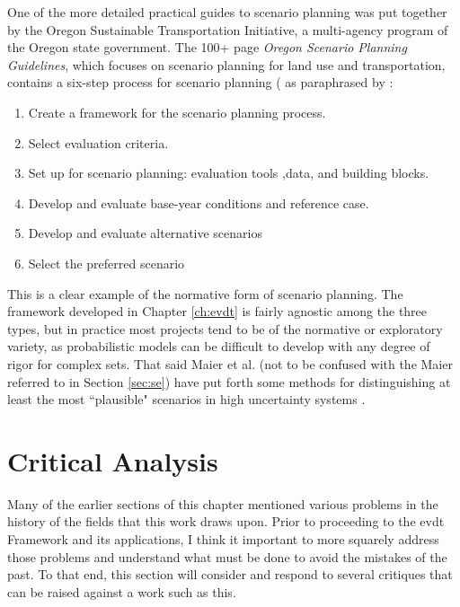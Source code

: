 One of the more detailed practical guides to scenario planning was put together by the Oregon Sustainable Transportation Initiative, a multi-agency program of the Oregon state government. The 100+ page \textit{Oregon Scenario Planning Guidelines}, which focuses on scenario planning for land use and transportation, contains a six-step process for scenario planning ( \cite{oregonsustainabletransportationinitiativeScenarioPlanningGuidelines2017} as paraphrased by \cite{goodspeedScenarioPlanningCities2020}:

\begin{enumerate}[itemsep=0pt,parsep=0pt]
	\item{Create a framework for the scenario planning process.}
	\item{Select evaluation criteria.}
	\item{Set up for scenario planning: evaluation tools ,data, and building blocks.}
	\item{Develop and evaluate base-year conditions and reference case.}
	\item{Develop and evaluate alternative scenarios}
	\item{Select the preferred scenario}
\end{enumerate}

This is a clear example of the normative form of scenario planning. The framework developed in Chapter \ref{ch:evdt} is fairly agnostic among the three types, but in practice most projects tend to be of the normative or exploratory variety, as probabilistic models can be difficult to develop with any degree of rigor for complex \acf{sets}. That said Maier et al. (not to be confused with the Maier referred to in Section \ref{sec:se}) have put forth some methods for distinguishing at least the most ``plausible" scenarios in high uncertainty systems \cite{maierUncertainFutureDeep2016}.

\section{Critical Analysis} \label{sec:critiques}

Many of the earlier sections of this chapter mentioned various problems in the history of the fields that this work draws upon. Prior to proceeding to the \ac{evdt} Framework and its applications, I think it important to more squarely address those problems and understand what must be done to avoid the mistakes of the past. To that end, this section will consider and respond to several critiques that can be raised against a work such as this.

